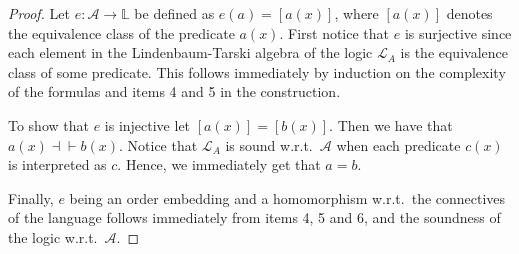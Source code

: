 \documentclass[10pt,a4paper]{amsart}
\begin{document}
\begin{proof}
	Let $e:\mathcal{A}\to\mathbb{L}$ be defined as $e(a)=[a(x)]$, where $[a(x)]$ denotes the equivalence class of the predicate $a(x)$. First notice that $e$ is surjective since each element in the Lindenbaum-Tarski algebra of the logic $\mathcal{L}_A$ is  the equivalence class of some predicate. This follows immediately by induction on the complexity of the formulas and items 4 and 5 in the construction.
	
	To show that $e$ is injective let $[a(x)]=[b(x)]$. Then we have that $a(x)\dashv\vdash b(x)$. Notice that $\mathcal{L}_A$ is sound w.r.t.\ $\mathcal{A}$ when each predicate $c(x)$ is interpreted as $c$. Hence, we immediately get that $a=b$.
	
	Finally, $e$ being an order embedding and a homomorphism w.r.t.\ the connectives of the language follows immediately from items 4, 5 and 6, and the soundness of the logic w.r.t.\ $\mathcal{A}$.
\end{proof}
\end{document}
